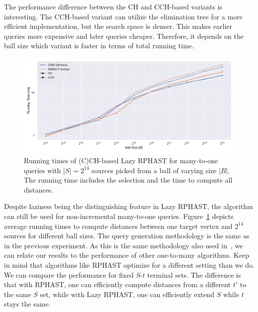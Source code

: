 \documentclass[manuscript,review]{acmart}
\begin{document}
The performance difference between the CH and CCH-based variants is interesting.
The CCH-based variant can utilize the elimination tree for a more efficient implementation, but the search space is denser.
This makes earlier queries more expensive and later queries cheaper.
Therefore, it depends on the ball size which variant is faster in terms of total running time.

\begin{figure}
\centering
\includegraphics[width=\linewidth]{fig/lazy_rphast_many_to_one_both.pdf}
\caption{
Running times of (C)CH-based Lazy RPHAST for many-to-one queries with $|S| = 2^{14}$ sources picked from a ball of varying size $|B|$.
The running time includes the selection and the time to compute all distances.
}\label{fig:many_to_one}
\end{figure}

Despite laziness being the distinguishing feature in Lazy RPHAST, the algorithm can still be used for non-incremental many-to-one queries.
Figure~\ref{fig:many_to_one} depicts average running times to compute distances between one target vertex and $2^{14}$ sources for different ball sizes.
The query generation methodology is the same as in the previous experiment.
As this is the same methodology also used in~\cite{delling_et_al:OASIcs:2011:3266}, we can relate our results to the performance of other one-to-many algorithms.
Keep in mind that algorithms like RPHAST optimize for a different setting than we do.
We can compare the performance for fixed $S$-$t$ terminal sets.
The difference is that with RPHAST, one can efficiently compute distances from a different $t'$ to the same $S$ set, while with Lazy RPHAST, one can efficiently extend $S$ while $t$ stays the same.
\end{document}
